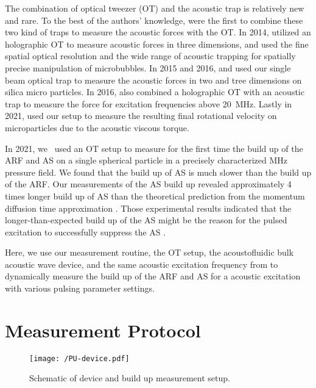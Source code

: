The combination of optical tweezer (OT) and the acoustic trap is relatively new 
and rare. To the best of the authors' knowledge,  were 
\citeyear{Thalhammer2011} the first to combine these two kind of traps to 
measure the acoustic forces with the OT. In 2014,  
utilized an holographic OT to measure acoustic forces in three dimensions, and 
 used the fine spatial optical resolution and the wide range of 
acoustic trapping for spatially precise manipulation of microbubbles. In 2015 
and 2016,  and  used our single beam 
optical trap to measure the acoustic forces in two and tree dimensions on 
silica micro particles. In 2016,  also combined a 
holographic OT with an acoustic trap to measure the force for excitation 
frequencies above \SI{20}{\mega\hertz}. Lastly in 2021,  
used our setup to measure the resulting final rotational velocity on 
microparticles due to the acoustic viscous torque.

In 2021, we~\cite{Goering2021} used an OT setup to measure for the first time 
the build up of the ARF and AS on a single spherical particle in a precisely 
characterized \si{\mega\hertz} pressure field. We found that the build up of AS 
is much slower than the build up of the ARF. Our measurements of the AS build 
up revealed approximately 4 times longer build up of AS than the theoretical 
prediction from the momentum diffusion time approximation 
\cite{Muller2015,Goering2021}. Those experimental results indicated that the 
longer-than-expected build up of the AS might be the reason for the pulsed 
excitation to successfully suppress the AS \cite{Hoyos2013,Castro2016}.



Here, we use our measurement routine, the OT setup, the acoustofluidic bulk 
acoustic wave device, and the same acoustic excitation frequency from 
\cite{Goering2021} to dynamically measure the build up of the ARF and AS for a 
acoustic excitation with various pulsing parameter settings.

\section{Measurement Protocol}

\begin{figure}[tbp]
  \centering
  \texttt{[image: /PU-device.pdf]}
  \caption{Schematic of device and build up measurement 
  setup.}\label{fig:PU-device}
\end{figure}

